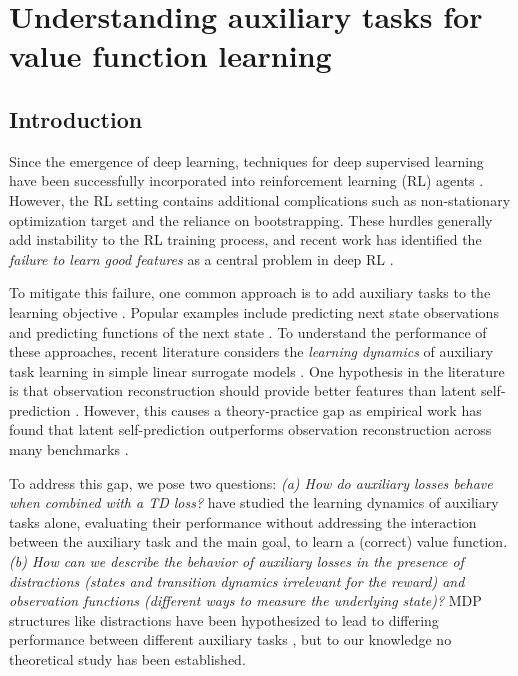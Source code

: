 \chapter{Understanding auxiliary tasks for value function learning}

\section{Introduction}

Since the emergence of deep learning, techniques for deep supervised learning have been successfully incorporated into reinforcement learning (RL) agents \parencite{dqn,ddpg}.
However, the RL setting contains additional complications such as non-stationary optimization target and the reliance on bootstrapping.
These hurdles generally add instability to the RL training process, and recent work has identified the \emph{failure to learn good features} as a central problem in deep RL \parencite{lyle2022understanding,nikishin2022primacy,kumar2021implicit}.

To mitigate this failure, one common approach is to add auxiliary tasks to the learning objective \parencite{jaderberg2017reinforcement}. 
Popular examples include predicting next state observations \parencite{jaderberg2016reinforcement} and predicting functions of the next state \parencite{schwarzer2021dataefficient,ni2024bridging}.
To understand the performance of these approaches, recent literature \parencite{tang2022understanding,lelan2023bootstrapped} considers the \emph{learning dynamics} of auxiliary task learning in simple linear surrogate models \parencite{saxe2014exact}.
One hypothesis in the literature is that observation reconstruction should provide better features than latent self-prediction \parencite{behzadian2019fast,tang2022understanding}. 
However, this causes a theory-practice gap as empirical work has found that latent self-prediction outperforms observation reconstruction across many benchmarks \parencite{schwarzer2021dataefficient,ni2024bridging}.

To address this gap, we pose two questions: \emph{(a) How do auxiliary losses behave when combined with a TD loss?} \textcite{tang2022understanding,lelan2022generalization,tang2023towards} have studied the learning dynamics of auxiliary tasks alone, evaluating their performance without addressing the interaction between the auxiliary task and the main goal, to learn a (correct) value function. \emph{(b) How can we describe the behavior of auxiliary losses in the presence of distractions (states and transition dynamics irrelevant for the reward) and observation functions (different ways to measure the underlying state)?} MDP structures like distractions have been hypothesized to lead to differing performance between different auxiliary tasks \parencite{ni2024bridging}, but to our knowledge no theoretical study has been established.


